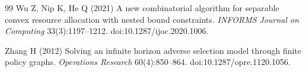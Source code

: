 \begin{thebibliography}{99}
Wu Z, Nip K, He Q (2021) A new combinatorial algorithm for separable convex resource allocation with nested bound constraints. \emph{INFORMS Journal on Computing} 33(3):1197--1212. doi:10.1287/ijoc.2020.1006.

Zhang H (2012) Solving an infinite horizon adverse selection model through finite policy graphs. \emph{Operations Research} 60(4):850--864. doi:10.1287/opre.1120.1056.
\end{thebibliography}
